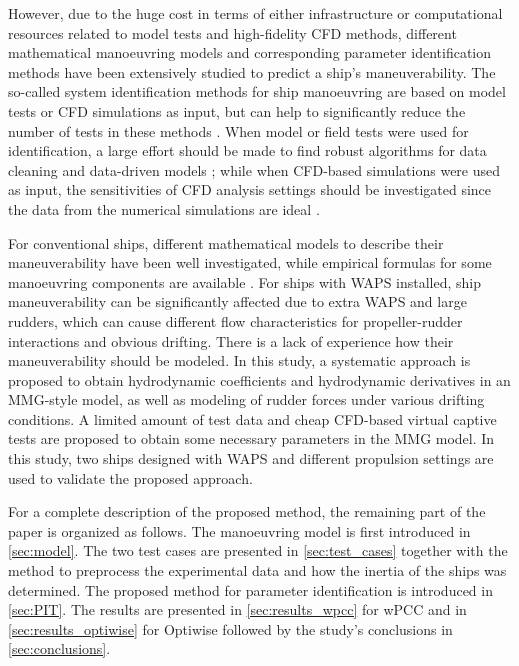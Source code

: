 However, due to the huge cost in terms of either infrastructure or computational resources related to model tests and high-fidelity CFD methods, different mathematical manoeuvring models and corresponding parameter identification methods have been extensively studied to predict a ship’s maneuverability. The so-called system identification methods for ship manoeuvring are based on model tests or CFD simulations as input, but can help to significantly reduce the number of tests in these methods \citep{lokukalugep.pereraSystemIdentificationVessel2016,alexanderssonSystemIdentificationPhysicsinformed2024b}. When model or field tests were used for identification, a large effort should be made to find robust algorithms for data cleaning and data-driven models \citep{revestidoherreroTwostepIdentificationNonlinear2012,alexanderssonSystemIdentificationVessel2022,duShipManoeuvringPrediction2022}; while when CFD-based simulations were used as input, the sensitivities of CFD analysis settings should be investigated since the data from the numerical simulations are ideal \citep{liuPredictionsShipManeuverability2018}.

For conventional ships, different mathematical models to describe their maneuverability have been well investigated, while empirical formulas for some manoeuvring components are available \citep{yasukawaIntroductionMMGStandard2015}. For ships with WAPS installed, ship maneuverability can be significantly affected due to extra WAPS and large rudders, which can cause different flow characteristics for propeller-rudder interactions and obvious drifting. There is a lack of experience how their maneuverability should be modeled. In this study, a systematic approach is proposed to obtain hydrodynamic coefficients and hydrodynamic derivatives in an MMG-style model, as well as modeling of rudder forces under various drifting conditions. A limited amount of test data and cheap CFD-based virtual captive tests are proposed to obtain some necessary parameters in the MMG model. In this study, two ships designed with WAPS and different propulsion settings are used to validate the proposed approach. 

For a complete description of the proposed method, the remaining part of the paper is organized as follows. 
The manoeuvring model is first introduced in \autoref{sec:model}. The two test cases are presented in \autoref{sec:test_cases} together with the method to preprocess the experimental data and how the inertia of the ships was determined. The proposed method for parameter identification is introduced in \autoref{sec:PIT}. The results are presented in \autoref{sec:results_wpcc} for wPCC and in \autoref{sec:results_optiwise} for Optiwise followed by the study's conclusions in \autoref{sec:conclusions}.


